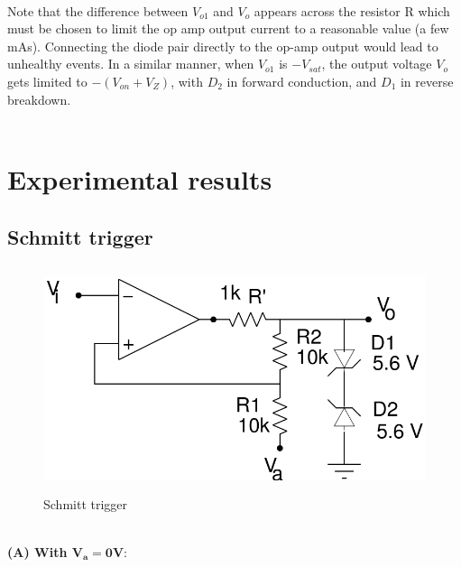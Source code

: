\documentclass[12pt]{article}
\begin{document}
        \\
        Note that the difference between $V_{o1}$ and $V_o$ appears across the resistor R which must be chosen to limit the op amp output current to a reasonable value (a few mAs). Connecting the diode pair directly to the op-amp output would lead to unhealthy events. In a similar manner, when $V_{o1}$ is $−V_{sat}$, the output voltage $V_o$ gets limited to $−(V_{on} + V_Z)$, with $D_2$ in forward conduction, and $D_1$ in reverse breakdown.\\
        \\
\newpage
\section{Experimental results}

\subsection{Schmitt trigger}
        \begin{figure}[H]
            \centering
            \includegraphics[width = 0.7\linewidth, height = 2.6in]{reports/lab2/scmidt.png}
            \caption{Schmitt trigger}
        \end{figure}
        
      \\
      \textbf{(A) With $\mathbf{V_{a} = 0V :}$}\\
         
\end{document}
